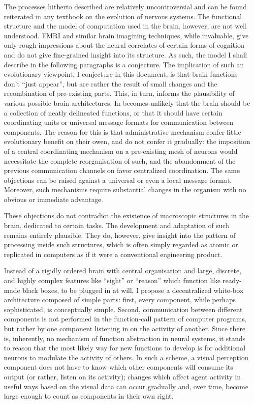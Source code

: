 The processes hitherto described are relatively uncontroversial and can be found reiterated in any textbook on the evolution of nervous systems. The functional structure and the model of computation used in the brain, however, are not well understood. FMRI and similar brain imagining techniques, while invaluable, give only rough impressions about the neural correlates of certain forms of cognition and do not give fine-grained insight into its structure. As such, the model I shall describe in the following paragraphs is a conjecture. The implication of such an evolutionary viewpoint, I conjecture in this document, is that brain functions don't ``just appear'', but are rather the result of small changes and the recombination of pre-existing parts. This, in turn, informs the plausibility of various possible brain architectures. In becomes unlikely that the brain should be a collection of neatly delineated functions, or that it should have certain coordinating units or universal message formats for communication between components. The reason for this is that administrative mechanism confer little evolutionary benefit on their owen, and do not confer it gradually: the imposition of a central coordinating mechanism on a pre-existing mesh of neurons would necessitate the complete reorganisation of such, and the abandonment of the previous communication channels on favor centralized coordination. The same objections can be raised against a universal or even a local message format. Moreover, such mechanisms require substantial changes in the organism with no obvious or immediate advantage.

These objections do not contradict the existence of macroscopic structures in the brain, dedicated to certain tasks. The development and adaptation of such remains entirely plausible. They do, however, give insight into the pattern of processing inside such structures, which is often simply regarded as atomic or replicated in computers as if it were a conventional engineering product.

Instead of a rigidly ordered brain with central organisation and large, discrete, and highly complex features like ``sight'' or ``reason'' which function like ready-made black boxes, to be plugged in at will, I propose a decentralized white-box architecture composed of simple parts: first, every component, while perhaps sophisticated, is conceptually simple. Second, communication between different components is not performed in the function-call pattern of computer programs, but rather by one component listening in on the activity of another. Since there is, inherently, no mechanism of function abstraction in neural systems, it stands to reason that the most likely way for new functions to develop is for additional neurons to modulate the activity of others. In such a scheme, a visual perception component does not have to know which other components will consume its output (or rather, listen on its activity); changes which affect agent activity in useful ways based on the visual data can occur gradually and, over time, become large enough to count as components in their own right.

